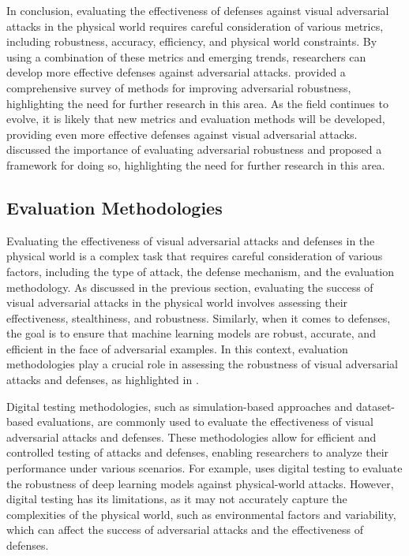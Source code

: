 \documentclass[11pt,a4paper]{article}
\begin{document}
In conclusion, evaluating the effectiveness of defenses against visual adversarial attacks in the physical world requires careful consideration of various metrics, including robustness, accuracy, efficiency, and physical world constraints. By using a combination of these metrics and emerging trends, researchers can develop more effective defenses against adversarial attacks. \cite{doi:10.1109/access.2022.3216291} provided a comprehensive survey of methods for improving adversarial robustness, highlighting the need for further research in this area. As the field continues to evolve, it is likely that new metrics and evaluation methods will be developed, providing even more effective defenses against visual adversarial attacks. \cite{doi:10.1109/access.2022.3208131} discussed the importance of evaluating adversarial robustness and proposed a framework for doing so, highlighting the need for further research in this area.


\subsection{Evaluation Methodologies}


Evaluating the effectiveness of visual adversarial attacks and defenses in the physical world is a complex task that requires careful consideration of various factors, including the type of attack, the defense mechanism, and the evaluation methodology. As discussed in the previous section, evaluating the success of visual adversarial attacks in the physical world involves assessing their effectiveness, stealthiness, and robustness. Similarly, when it comes to defenses, the goal is to ensure that machine learning models are robust, accurate, and efficient in the face of adversarial examples. In this context, evaluation methodologies play a crucial role in assessing the robustness of visual adversarial attacks and defenses, as highlighted in \cite{doi:10.24963/ijcai.2021/694}.

Digital testing methodologies, such as simulation-based approaches and dataset-based evaluations, are commonly used to evaluate the effectiveness of visual adversarial attacks and defenses. These methodologies allow for efficient and controlled testing of attacks and defenses, enabling researchers to analyze their performance under various scenarios. For example, \cite{arxiv:1707.08945} uses digital testing to evaluate the robustness of deep learning models against physical-world attacks. However, digital testing has its limitations, as it may not accurately capture the complexities of the physical world, such as environmental factors and variability, which can affect the success of adversarial attacks and the effectiveness of defenses.
\end{document}
